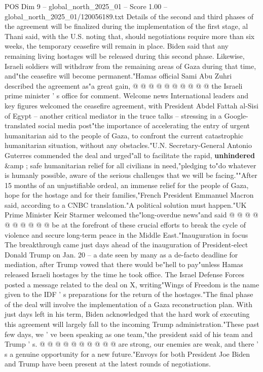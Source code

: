 \begin{textsample}{POS Dim 9 – global\_north\_2025\_01 – Score 1.00 – global\_north\_2025\_01/120056189.txt}
Details of the second and third phases of the agreement will be finalized during the implementation of the first stage, al Thani said, with the U.S. noting that, should negotiations require more than six weeks, the temporary ceasefire will remain in place.
Biden said that any remaining living hostages will be released during this second phase.
Likewise, Israeli soldiers will withdraw from the remaining areas of Gaza during that time, and"the ceasefire will become permanent."Hamas official Sami Abu Zuhri described the agreement as"a great gain, @ @ @ @ @ @ @ @ @ @ the Israeli prime minister ' s office for comment.
Welcome news International leaders and key figures welcomed the ceasefire agreement, with President Abdel Fattah al-Sisi of Egypt -- another critical mediator in the truce talks -- stressing in a Google-translated social media post"the importance of accelerating the entry of urgent humanitarian aid to the people of Gaza, to confront the current catastrophic humanitarian situation, without any obstacles."U.N.
Secretary-General Antonio Guterres commended the deal and urged"all to facilitate the rapid, \textbf{unhindered} \&amp ; safe humanitarian relief for all civilians in need,"pledging to"do whatever is humanly possible, aware of the serious challenges that we will be facing.""After 15 months of an unjustifiable ordeal, an immense relief for the people of Gaza, hope for the hostage and for their families,"French President Emmanuel Macron said, according to a CNBC translation."A political solution must happen."UK Prime Minister Keir Starmer welcomed the"long-overdue news"and said @ @ @ @ @ @ @ @ @ @ be at the forefront of these crucial efforts to break the cycle of violence and secure long-term peace in the Middle East."Inauguration in focus The breakthrough came just days ahead of the inauguration of President-elect Donald Trump on Jan. 20 -- a date seen by many as a de-facto deadline for mediation, after Trump vowed that there would be"hell to pay"unless Hamas released Israeli hostages by the time he took office.
The Israel Defense Forces posted a message related to the deal on X, writing"Wings of Freedom is the name given to the IDF ' s preparations for the return of the hostages."The final phase of the deal will involve the implementation of a Gaza reconstruction plan.
With just days left in his term, Biden acknowledged that the hard work of executing this agreement will largely fall to the incoming Trump administration."These past few days, we ' ve been speaking as one team,"the president said of his team and Trump ' s. @ @ @ @ @ @ @ @ @ @ are strong, our enemies are weak, and there ' s a genuine opportunity for a new future."Envoys for both President Joe Biden and Trump have been present at the latest rounds of negotiations.

\end{textsample}
